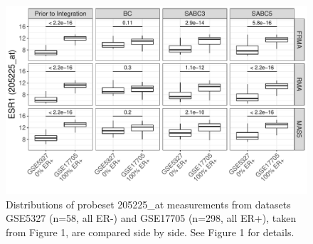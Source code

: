 \documentclass{article}\usepackage[]{graphicx}\usepackage[]{color}
\makeatletter
\def\maxwidth{ %
  \ifdim\Gin@nat@width>\linewidth
    \linewidth
  \else
    \Gin@nat@width
  \fi
}
\newenvironment{knitrout}{}{} %
\makeatother
\begin{document}
\begin{knitrout}
\color{fgcolor}\begin{figure}

{\centering \includegraphics[width=\maxwidth]{figure/er-a-extreme-datasets-by-er-status-1} 

}

\caption[Distributions of probeset 205225\_at measurements from datasets GSE5327 (n=58, all ER-) and GSE17705 (n=298, all ER+), taken from Figure 1, are compared side by side]{Distributions of probeset 205225\_at measurements from datasets GSE5327 (n=58, all ER-) and GSE17705 (n=298, all ER+), taken from Figure 1, are compared side by side. See Figure 1 for details.}\label{fig:er-a-extreme-datasets-by-er-status}
\end{figure}


\end{knitrout}
\end{document}
